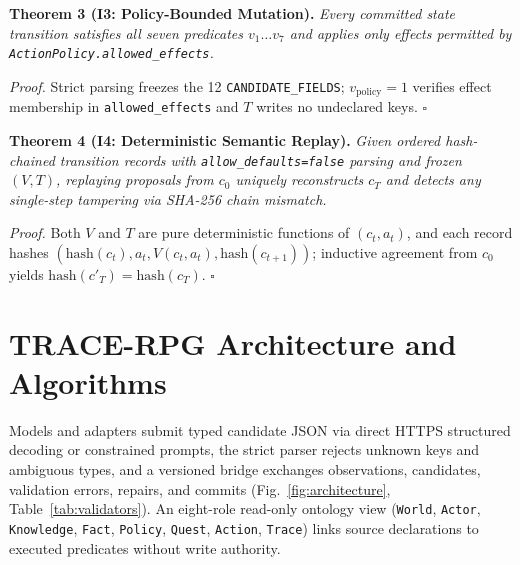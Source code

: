 \noindent\textbf{Theorem 3 (I3: Policy-Bounded Mutation).} \emph{Every committed state transition satisfies all seven predicates $v_1\dots v_7$ and applies only effects permitted by \texttt{ActionPolicy.}\allowbreak\texttt{allowed\_}\allowbreak\texttt{effects}.}
\par\noindent\textit{Proof.} Strict parsing freezes the 12 \texttt{CANDIDATE\_}\allowbreak\texttt{FIELDS}; $v_{\mathrm{policy}}{=}1$ verifies effect membership in \texttt{allowed\_}\allowbreak\texttt{effects} and $T$ writes no undeclared keys. \hfill$\square$

\noindent\textbf{Theorem 4 (I4: Deterministic Semantic Replay).} \emph{Given ordered hash-chained transition records with \texttt{allow\_}\allowbreak\texttt{defaults=false} parsing and frozen $(V,T)$, replaying proposals from $c_0$ uniquely reconstructs $c_T$ and detects any single-step tampering via SHA-256 chain mismatch.}
\par\noindent\textit{Proof.} Both $V$ and $T$ are pure deterministic functions of $(c_t,a_t)$, and each record hashes $(\mathrm{hash}(c_t),\allowbreak a_t,\allowbreak V(c_t,a_t),\allowbreak\mathrm{hash}(c_{t+1}))$; inductive agreement from $c_0$ yields $\mathrm{hash}(c'_T)=\mathrm{hash}(c_T)$. \hfill$\square$

\section{TRACE-RPG Architecture and Algorithms}\label{sec:arch}
Models and adapters submit typed candidate JSON via direct HTTPS structured decoding or constrained prompts, the strict parser rejects unknown keys and ambiguous types, and a versioned bridge exchanges observations, candidates, validation errors, repairs, and commits (Fig.~\ref{fig:architecture}, Table~\ref{tab:validators}). An eight-role read-only ontology view (\texttt{World}, \texttt{Actor}, \texttt{Knowledge}, \texttt{Fact}, \texttt{Policy}, \texttt{Quest}, \texttt{Action}, \texttt{Trace}) links source declarations to executed predicates without write authority.

